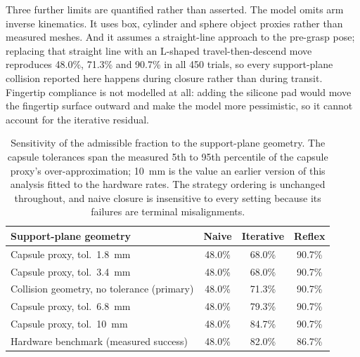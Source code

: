 Three further limits are quantified rather than asserted. The model omits arm
inverse kinematics. It uses box, cylinder and sphere object proxies rather than
measured meshes. And it assumes a straight-line approach to the pre-grasp pose;
replacing that straight line with an L-shaped travel-then-descend move reproduces
48.0\%, 71.3\% and 90.7\% in all 450 trials, so every support-plane collision
reported here happens during closure rather than during transit. Fingertip
compliance is not modelled at all: adding the silicone pad would move the
fingertip surface outward and make the model more pessimistic, so it cannot
account for the iterative residual.


\begin{table}[t]
  \centering
  \caption{Sensitivity of the admissible fraction to the support-plane geometry.
  The capsule tolerances span the measured 5th to 95th percentile of the capsule
  proxy's over-approximation; \SI{10}{\milli\metre} is the value an earlier
  version of this analysis fitted to the hardware rates. The strategy ordering is
  unchanged throughout, and naive closure is insensitive to every setting because
  its failures are terminal misalignments.}
  \label{tab:admissibility_sensitivity}
  \begin{tabular}{lccc}
    \toprule
    Support-plane geometry & Naive & Iterative & Reflex \\
    \midrule
    Capsule proxy, tol.\ \SI{1.8}{\milli\metre}  & 48.0\% & 68.0\% & 90.7\% \\
    Capsule proxy, tol.\ \SI{3.4}{\milli\metre}  & 48.0\% & 68.0\% & 90.7\% \\
    Collision geometry, no tolerance (primary)   & 48.0\% & 71.3\% & 90.7\% \\
    Capsule proxy, tol.\ \SI{6.8}{\milli\metre}  & 48.0\% & 79.3\% & 90.7\% \\
    Capsule proxy, tol.\ \SI{10}{\milli\metre}   & 48.0\% & 84.7\% & 90.7\% \\
    \midrule
    Hardware benchmark (measured success) & 48.0\% & 82.0\% & 86.7\% \\
    \bottomrule
  \end{tabular}
\end{table}

